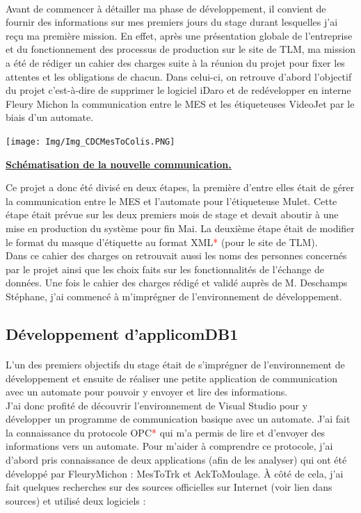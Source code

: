 \documentclass[a4paper,12pt]{extarticle}
\newcommand{\espace}{\vspace{0.3cm}}
\begin{document}
		\paragraph{}
	
	Avant de commencer à détailler ma phase de développement, il convient de fournir des informations sur mes premiers jours du stage durant lesquelles j’ai reçu ma première mission. En effet, après une présentation globale de l’entreprise et du fonctionnement des processus de production sur le site de TLM, ma mission a été de rédiger un cahier des charges suite à la réunion du projet pour fixer les attentes et les obligations de chacun. Dans celui-ci, on retrouve d’abord l’objectif du projet c’est-à-dire de supprimer le logiciel iDaro et de redévelopper en interne Fleury Michon la communication entre le MES et les étiqueteuses VideoJet par le biais d’un automate.\\

\centerline{\texttt{[image: Img/Img\_CDCMesToColis.PNG]}}
\centerline{\textbf{\underline{Schématisation de la nouvelle communication.}}}
\espace{}

Ce projet a donc été divisé en deux étapes, la première d’entre elles était de gérer la communication entre le MES et l’automate pour l’étiqueteuse Mulet. Cette étape était prévue sur les deux premiers mois de stage et devait aboutir à une mise en production du système pour fin Mai. La deuxième étape était de modifier le format du masque d’étiquette au format XML\textcolor{red}{*} (pour le site de TLM).\\
Dans ce cahier des charges on retrouvait aussi les noms des personnes concernés par le projet ainsi que les choix faits sur les fonctionnalités de l’échange de données. Une fois le cahier des charges rédigé et validé auprès de M. Deschamps Stéphane, j’ai commencé à m'imprégner de l’environnement de développement.

	\subsection{Développement d'applicomDB1}
		\paragraph{}
	
	L’un des premiers objectifs du stage était de s'imprégner de l’environnement de développement et ensuite de réaliser une petite application de communication avec un automate pour pouvoir y envoyer et lire des informations.\\
J’ai donc profité de découvrir l’environnement de Visual Studio pour y développer un programme de communication basique avec un automate. J’ai fait la connaissance du protocole OPC\textcolor{red}{*} qui m’a permis de lire et d’envoyer des informations vers un automate. Pour m’aider à comprendre ce protocole, j’ai d’abord pris connaissance de deux applications (afin de les analyser) qui ont été développé par FleuryMichon : MesToTrk et AckToMoulage. À côté de cela, j’ai fait quelques recherches sur des sources officielles sur Internet (voir lien dans sources) et utilisé deux logiciels : 
\end{document}

